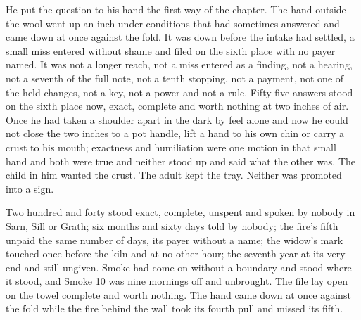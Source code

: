 He put the question to his hand the first way of the chapter. The hand outside the wool went up an inch under conditions that had sometimes answered and came down at once against the fold. It was down before the intake had settled, a small miss entered without shame and filed on the sixth place with no payer named. It was not a longer reach, not a miss entered as a finding, not a hearing, not a seventh of the full note, not a tenth stopping, not a payment, not one of the held changes, not a key, not a power and not a rule. Fifty-five answers stood on the sixth place now, exact, complete and worth nothing at two inches of air. Once he had taken a shoulder apart in the dark by feel alone and now he could not close the two inches to a pot handle, lift a hand to his own chin or carry a crust to his mouth; exactness and humiliation were one motion in that small hand and both were true and neither stood up and said what the other was. The child in him wanted the crust. The adult kept the tray. Neither was promoted into a sign.

Two hundred and forty stood exact, complete, unspent and spoken by nobody in Sarn, Sill or Grath; six months and sixty days told by nobody; the fire's fifth unpaid the same number of days, its payer without a name; the widow's mark touched once before the kiln and at no other hour; the seventh year at its very end and still ungiven. Smoke had come on without a boundary and stood where it stood, and Smoke 10 was nine mornings off and unbrought. The file lay open on the towel complete and worth nothing. The hand came down at once against the fold while the fire behind the wall took its fourth pull and missed its fifth.
